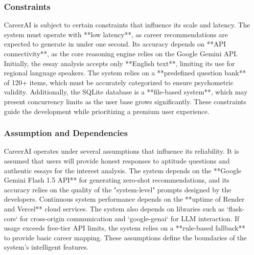 \subsubsection{{Constraints}}
{}{CareerAI is subject to certain constraints that influence its scale and latency. The system must operate with **low latency**, as career recommendations are expected to generate in under one second. Its accuracy depends on **API connectivity**, as the core reasoning engine relies on the Google Gemini API. Initially, the essay analysis accepts only **English text**, limiting its use for regional language speakers. The system relies on a **predefined question bank** of 120+ items, which must be accurately categorized to ensure psychometric validity. Additionally, the SQLite database is a **file-based system**, which may present concurrency limits as the user base grows significantly. These constraints guide the development while prioritizing a premium user experience.}

\subsubsection{{Assumption and Dependencies}}
{}{CareerAI operates under several assumptions that influence its reliability. It is assumed that users will provide honest responses to aptitude questions and authentic essays for the interest analysis. The system depends on the **Google Gemini Flash 1.5 API** for generating zero-shot recommendations, and its accuracy relies on the quality of the "system-level" prompts designed by the developers. Continuous system performance depends on the **uptime of Render and Vercel** cloud services. The system also depends on libraries such as `flask-cors` for cross-origin communication and `google-genai` for LLM interaction. If usage exceeds free-tier API limits, the system relies on a **rule-based fallback** to provide basic career mapping. These assumptions define the boundaries of the system's intelligent features.}
